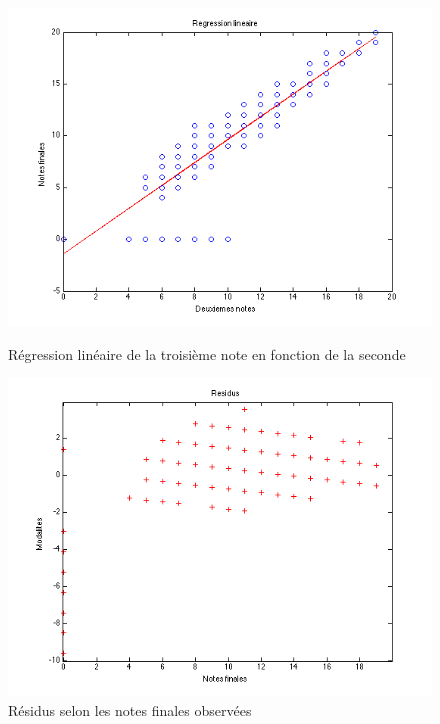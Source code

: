 \documentclass[11pt]{article}
\begin{document}
\begin{figure}[h]
\centering
\includegraphics[scale=0.5]{Images/fig13.png}
\caption{Régression linéaire de la troisième note en fonction de la seconde}
\includegraphics[scale=0.5]{Images/fig14.png}
\caption{Résidus selon les notes finales observées}
\end{figure}
\end{document}
